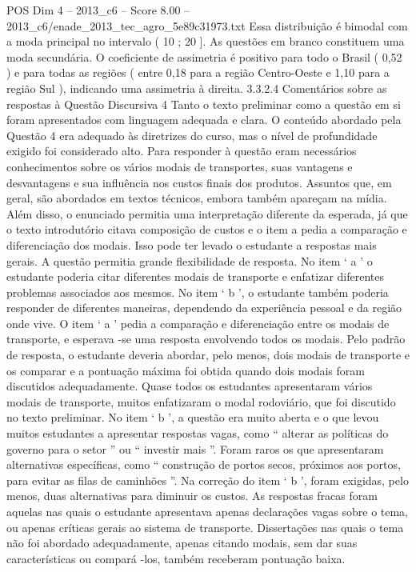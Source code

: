 \begin{textsample}{POS Dim 4 – 2013\_c6 – Score 8.00 – 2013\_c6/enade\_2013\_tec\_agro\_5e89c31973.txt}
Essa distribuição é bimodal com a moda principal no intervalo ( 10 ; 20 ].
As questões em branco constituem uma moda secundária.
O coeficiente de assimetria é positivo para todo o Brasil ( 0,52 ) e para todas as regiões ( entre 0,18 para a região Centro-Oeste e 1,10 para a região Sul ), indicando uma assimetria à direita. 3.3.2.4 Comentários sobre as respostas à Questão Discursiva 4 Tanto o texto preliminar como a questão em si foram apresentados com linguagem adequada e clara.
O conteúdo abordado pela Questão 4 era adequado às diretrizes do curso, mas o nível de profundidade exigido foi considerado alto.
Para responder à questão eram necessários conhecimentos sobre os vários modais de transportes, suas vantagens e desvantagens e sua influência nos custos finais dos produtos.
Assuntos que, em geral, são abordados em textos técnicos, embora também apareçam na mídia.
Além disso, o enunciado permitia uma interpretação diferente da esperada, já que o texto introdutório citava composição de custos e o item a pedia a comparação e diferenciação dos modais.
Isso pode ter levado o estudante a respostas mais gerais.
A questão permitia grande flexibilidade de resposta.
No item ‘ a ’ o estudante poderia citar diferentes modais de transporte e enfatizar diferentes problemas associados aos mesmos.
No item ‘ b ’, o estudante também poderia responder de diferentes maneiras, dependendo da experiência pessoal e da região onde vive.
O item ‘ a ’ pedia a comparação e diferenciação entre os modais de transporte, e esperava -se uma resposta envolvendo todos os modais.
Pelo padrão de resposta, o estudante deveria abordar, pelo menos, dois modais de transporte e os comparar e a pontuação máxima foi obtida quando dois modais foram discutidos adequadamente.
Quase todos os estudantes apresentaram vários modais de transporte, muitos enfatizaram o modal rodoviário, que foi discutido no texto preliminar.
No item ‘ b ’, a questão era muito aberta e o que levou muitos estudantes a apresentar respostas vagas, como “ alterar as políticas do governo para o setor ” ou “ investir mais ”.
Foram raros os que apresentaram alternativas específicas, como “ construção de portos secos, próximos aos portos, para evitar as filas de caminhões ”.
Na correção do item ‘ b ’, foram exigidas, pelo menos, duas alternativas para diminuir os custos.
As respostas fracas foram aquelas nas quais o estudante apresentava apenas declarações vagas sobre o tema, ou apenas críticas gerais ao sistema de transporte.
Dissertações nas quais o tema não foi abordado adequadamente, apenas citando modais, sem dar suas características ou compará -los, também receberam pontuação baixa.

\end{textsample}
